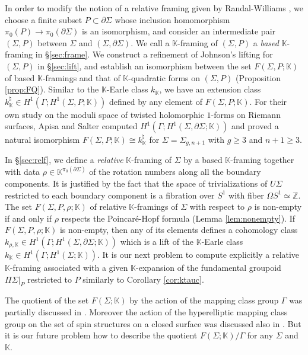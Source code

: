 \documentclass[a4paper,12pt, twoside]{amsart}
\theoremstyle{definition}
\theoremstyle{remark}
\numberwithin{equation}{section}
\newcommand\bK{{\mathbb{K}}}
\newcommand\bZ{{\mathbb{Z}}}
\newcommand\pa{\partial}
\begin{document}
\par
In order to modify the notion of a relative framing given by Randal-Williams \cite{RW14}, we choose a finite subset $P \subset \pa\Sigma$ whose inclusion homomorphism $\pi_0(P) \to \pi_0(\pa\Sigma)$ is an isomorphism, and consider an intermediate pair $(\Sigma, P)$ between $\Sigma$ and $(\Sigma, \pa\Sigma)$. 
We call a $\bK$-framing of $(\Sigma, P)$ a {\it based} $\bK$-framing in \S\ref{sec:frame}. 
We construct a refinement of Johnson's lifting for $(\Sigma, P)$ in \S\ref{sec:lift}, and establish an isomorphism between the set $F(\Sigma, P; \bK)$ of based $\bK$-framings and that of $\bK$-quadratic forms on $(\Sigma, P)$ (Proposition \ref{prop:FQ}).
Similar to the $\bK$-Earle class $k_\bK$, we have an extension class $k^\natural_\bK \in H^1(\Gamma; H^1(\Sigma, P; \bK))$ defined by any element of $F(\Sigma, P; \bK)$. For their own study on the moduli space of twisted holomorphic $1$-forms on Riemann surfaces, Apisa and Salter \cite[Theorem A.4]{ApisaSalter} computed $H^1(\Gamma; H^1(\Sigma, \pa\Sigma; \bK))$ and proved a natural isomorphism $F(\Sigma, P; \bK) \cong k^\natural_\bK$ for $\Sigma = \Sigma_{g,n+1}$ with $g \geq 3$ and $n+1 \geq 3$. \par
In \S\ref{sec:relf}, we define a {\it relative} $\bK$-framing of $\Sigma$ by a based $\bK$-framing together with data $\rho \in \bK^{\pi_0(\pa\Sigma)}$ of the rotation numbers along all the boundary components. 
It is justified by the fact that the space of trivializations of $U\Sigma$ restricted to each boundary component is a fibration over $S^1$ with fiber $\Omega S^1\simeq \bZ$. The set $F(\Sigma, P, \rho; \bK)$ of relative $\bK$-framings of $\Sigma$ with respect to $\rho$ is non-empty if and only if $\rho$ respects the Poincar\'e-Hopf formula (Lemma \ref{lem:nonempty}). If $F(\Sigma, P, \rho; \bK)$ is non-empty, then any of its elements defines a cohomology class $k_{\rho, \bK} \in H^1(\Gamma; H^1(\Sigma, \pa\Sigma; \bK))$ which is a lift of the $\bK$-Earle class $k_\bK \in H^1(\Gamma; H^1(\Sigma; \bK))$. 
It is our next problem to compute explicitly a relative $\bK$-framing
associated with a given $\bK$-expansion of the fundamental groupoid $\Pi\Sigma\vert_P$ restricted to $P$ similarly to Corollary \ref{cor:ktauc}. \par
The quotient of the set $F(\Sigma; \bK)$ by the action of the mapping class group $\Gamma$ was partially discussed in \cite{RW14, Kaw18}. 
Moreover the action of the hyperelliptic mapping class group on the set of spin structures on a closed surface was discussed also in \cite{Wang1}. 
But it is our future problem how to describe the quotient $F(\Sigma; \bK)/\Gamma$ for any $\Sigma$ and $\bK$. \par
\end{document}
